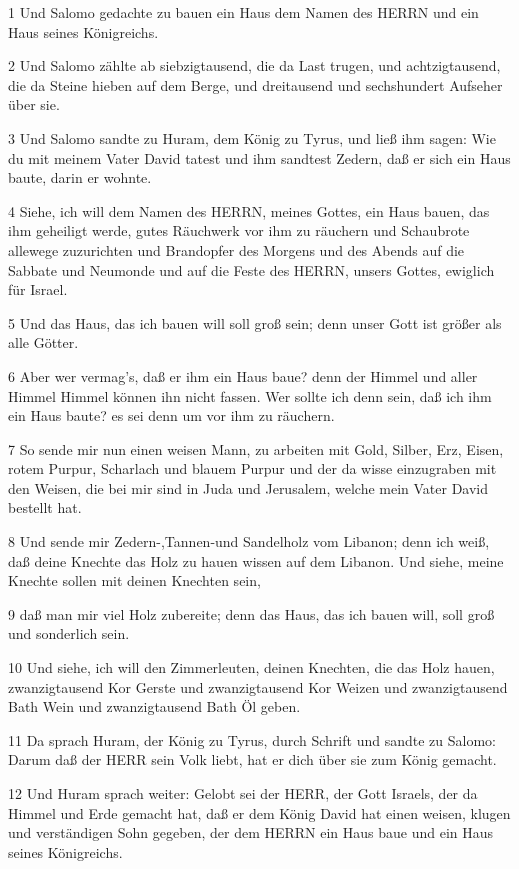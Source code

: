\par 1 Und Salomo gedachte zu bauen ein Haus dem Namen des HERRN und ein Haus seines Königreichs.
\par 2 Und Salomo zählte ab siebzigtausend, die da Last trugen, und achtzigtausend, die da Steine hieben auf dem Berge, und dreitausend und sechshundert Aufseher über sie.
\par 3 Und Salomo sandte zu Huram, dem König zu Tyrus, und ließ ihm sagen: Wie du mit meinem Vater David tatest und ihm sandtest Zedern, daß er sich ein Haus baute, darin er wohnte.
\par 4 Siehe, ich will dem Namen des HERRN, meines Gottes, ein Haus bauen, das ihm geheiligt werde, gutes Räuchwerk vor ihm zu räuchern und Schaubrote allewege zuzurichten und Brandopfer des Morgens und des Abends auf die Sabbate und Neumonde und auf die Feste des HERRN, unsers Gottes, ewiglich für Israel.
\par 5 Und das Haus, das ich bauen will soll groß sein; denn unser Gott ist größer als alle Götter.
\par 6 Aber wer vermag's, daß er ihm ein Haus baue? denn der Himmel und aller Himmel Himmel können ihn nicht fassen. Wer sollte ich denn sein, daß ich ihm ein Haus baute? es sei denn um vor ihm zu räuchern.
\par 7 So sende mir nun einen weisen Mann, zu arbeiten mit Gold, Silber, Erz, Eisen, rotem Purpur, Scharlach und blauem Purpur und der da wisse einzugraben mit den Weisen, die bei mir sind in Juda und Jerusalem, welche mein Vater David bestellt hat.
\par 8 Und sende mir Zedern-,Tannen-und Sandelholz vom Libanon; denn ich weiß, daß deine Knechte das Holz zu hauen wissen auf dem Libanon. Und siehe, meine Knechte sollen mit deinen Knechten sein,
\par 9 daß man mir viel Holz zubereite; denn das Haus, das ich bauen will, soll groß und sonderlich sein.
\par 10 Und siehe, ich will den Zimmerleuten, deinen Knechten, die das Holz hauen, zwanzigtausend Kor Gerste und zwanzigtausend Kor Weizen und zwanzigtausend Bath Wein und zwanzigtausend Bath Öl geben.
\par 11 Da sprach Huram, der König zu Tyrus, durch Schrift und sandte zu Salomo: Darum daß der HERR sein Volk liebt, hat er dich über sie zum König gemacht.
\par 12 Und Huram sprach weiter: Gelobt sei der HERR, der Gott Israels, der da Himmel und Erde gemacht hat, daß er dem König David hat einen weisen, klugen und verständigen Sohn gegeben, der dem HERRN ein Haus baue und ein Haus seines Königreichs.

